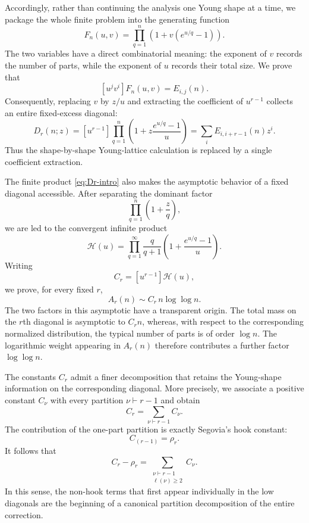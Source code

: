 \documentclass[11pt]{article}
\theoremstyle{definition}
\begin{document}
Accordingly, rather than continuing the analysis one Young shape at a
time, we package the whole finite problem into the generating function
\begin{equation}\label{eq:Fmaster-intro}
 F_n(u,v)
 =
 \prod_{q=1}^n
 \left(1+v(e^{u/q}-1)\right).
\end{equation}
The two variables have a direct combinatorial meaning: the exponent
of $v$ records the number of parts, while the exponent of $u$ records
their total size.  We prove that
\[
        [u^jv^i]F_n(u,v)=E_{i,j}(n).
\]
Consequently, replacing $v$ by $z/u$ and extracting the coefficient
of $u^{r-1}$ collects an entire fixed-excess diagonal:
\begin{equation}\label{eq:Dr-intro}
 D_r(n;z)
 =
 [u^{r-1}]
 \prod_{q=1}^{n}
 \left(
 1+z\frac{e^{u/q}-1}{u}
 \right)
 =
 \sum_i E_{i,i+r-1}(n)z^i.
\end{equation}
Thus the shape-by-shape Young-lattice calculation is replaced by a
single coefficient extraction.

The finite product \eqref{eq:Dr-intro} also makes the asymptotic
behavior of a fixed diagonal accessible.  After separating the
dominant factor
\[
        \prod_{q=1}^n\left(1+\frac{z}{q}\right),
\]
we are led to the convergent infinite product
\begin{equation}\label{eq:Hcal-intro}
 \mathcal H(u)
 =
 \prod_{q=1}^\infty
 \frac{q}{q+1}
 \left(
 1+\frac{e^{u/q}-1}{u}
 \right).
\end{equation}
Writing
\[
        C_r=[u^{r-1}]\mathcal H(u),
\]
we prove, for every fixed $r$,
\begin{equation}\label{eq:main-intro}
        A_r(n)\sim C_r\,n\log\log n.
\end{equation}
The two factors in this asymptotic have a transparent origin.  The
total mass on the $r$th diagonal is asymptotic to $C_r n$, whereas,
with respect to the corresponding normalized distribution, the
typical number of parts is of order $\log n$.  The logarithmic weight
appearing in $A_r(n)$ therefore contributes a further factor
$\log\log n$.

The constants $C_r$ admit a finer decomposition that retains the
Young-shape information on the corresponding diagonal.  More precisely, we associate a positive constant $C_\nu$ with every
partition $\nu\vdash r-1$ and obtain
\begin{equation}\label{eq:Cpartition-intro}
        C_r=\sum_{\nu\vdash r-1}C_\nu.
\end{equation}
The contribution of the one-part partition is exactly Segovia's hook
constant:
\[
        C_{(r-1)}=\rho_r.
\]
It follows that
\[
        C_r-\rho_r
        =
        \sum_{\substack{\nu\vdash r-1\\
                        \ell(\nu)\geq2}}
        C_\nu.
\]
In this sense, the non-hook terms that first appear individually in
the low diagonals are the beginning of a canonical partition
decomposition of the entire correction.
\end{document}
